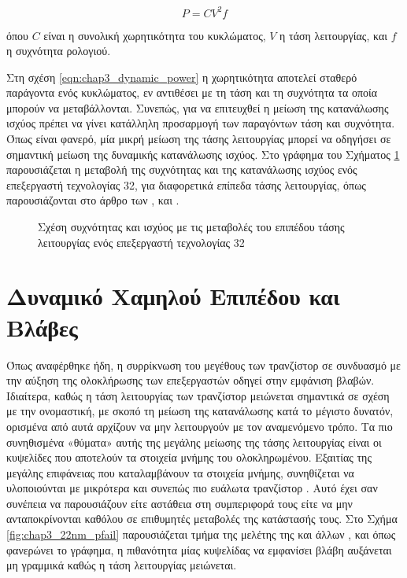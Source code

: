 \begin{equation}
    \label{eqn:chap3_dynamic_power}
    P = CV^{2}f
\end{equation}

\noindent
όπου $C$ είναι η συνολική χωρητικότητα του κυκλώματος, $V$ η τάση λειτουργίας, και $f$ η συχνότητα ρολογιού.
\par
Στη σχέση \eqref{eqn:chap3_dynamic_power} η χωρητικότητα αποτελεί σταθερό παράγοντα ενός κυκλώματος, εν αντιθέσει με τη τάση και τη συχνότητα τα οποία μπορούν να μεταβάλλονται. Συνεπώς, για να επιτευχθεί η μείωση της κατανάλωσης ισχύος πρέπει να γίνει κατάλληλη προσαρμογή των παραγόντων τάση και συχνότητα. Όπως είναι φανερό, μία μικρή μείωση της τάσης λειτουργίας μπορεί να οδηγήσει σε σημαντική μείωση της δυναμικής κατανάλωσης ισχύος. Στο γράφημα του Σχήματος \ref{fig:chap3_intel_ntv} παρουσιάζεται η μεταβολή της συχνότητας και της κατανάλωσης ισχύος ενός επεξεργαστή τεχνολογίας 32\nm, για διαφορετικά επίπεδα τάσης λειτουργίας, όπως παρουσιάζονται στο άρθρο των ,  και  \cite{de2016near}.

\begin{figure}[h]
    \centering
    \caption[Σχέση συχνότητας και ισχύος με τις μεταβολές του επιπέδου τάσης λειτουργίας ενός επεξεργαστή τεχνολογίας 32\nm]{Σχέση συχνότητας και ισχύος με τις μεταβολές του επιπέδου τάσης λειτουργίας ενός επεξεργαστή τεχνολογίας 32\nm \cite{de2016near}}
    \label{fig:chap3_intel_ntv}
\end{figure}


\section{Δυναμικό Χαμηλού Επιπέδου και Βλάβες}
\label{chap3_LowLevelVccFaults}

Όπως αναφέρθηκε ήδη, η συρρίκνωση του μεγέθους των τρανζίστορ σε συνδυασμό με την αύξηση της ολοκλήρωσης των επεξεργαστών οδηγεί στην εμφάνιση βλαβών. Ιδιαίτερα, καθώς η τάση λειτουργίας των τρανζίστορ μειώνεται σημαντικά σε σχέση με την ονομαστική, με σκοπό τη μείωση της κατανάλωσης κατά το μέγιστο δυνατόν, ορισμένα από αυτά αρχίζουν να μην λειτουργούν με τον αναμενόμενο τρόπο. Τα πιο συνηθισμένα «θύματα» αυτής της μεγάλης μείωσης της τάσης λειτουργίας είναι οι κυψελίδες  που αποτελούν τα στοιχεία μνήμης του ολοκληρωμένου. Εξαιτίας της μεγάλης επιφάνειας που καταλαμβάνουν τα στοιχεία μνήμης, συνηθίζεται να υλοποιούνται με μικρότερα και συνεπώς πιο ευάλωτα τρανζίστορ \cite{nassif2010resilience, gottscho2014power}. Αυτό έχει σαν συνέπεια να παρουσιάζουν είτε αστάθεια στη συμπεριφορά τους είτε να μην ανταποκρίνονται καθόλου σε επιθυμητές μεταβολές της κατάστασής τους. Στο Σχήμα \ref{fig:chap3_22nm_pfail} παρουσιάζεται τμήμα της μελέτης της  και άλλων \cite{ferreron2014block}, και όπως φανερώνει το γράφημα, η πιθανότητα μίας κυψελίδας  να εμφανίσει βλάβη αυξάνεται μη γραμμικά καθώς η τάση λειτουργίας μειώνεται.


